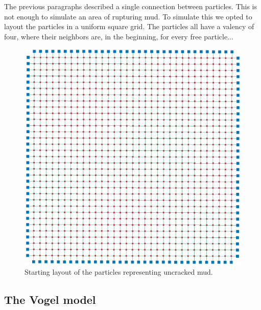 The previous paragraphs described a single connection between particles. This is not enough to simulate an area of rupturing mud. To simulate this we opted to layout the particles in a uniform square grid. The particles all have a valency of four, where their neighbors are, in the beginning, for every free particle... 

\begin{figure}
	\centering
	\includegraphics[width=0.9\columnwidth]{img/uniform_square_grid.png}
	\caption{Starting layout of the particles representing uncracked mud.}
	\label{fig:model:layout}
\end{figure}




\subsection{The Vogel model}\label{ss:method:vogel}

